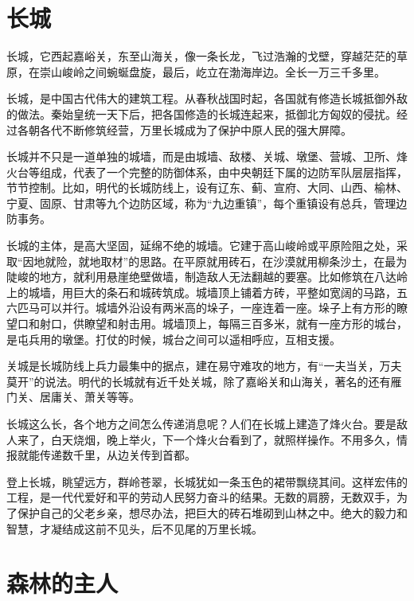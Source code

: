 \documentclass[12pt,UTF-8,openany]{ctexbook}
\begin{document}
\chapter{长城}

\begin{Large}
    
    长城，它西起嘉峪关，东至山海关，像一条长龙，飞过浩瀚的戈壁，穿越茫茫的草原，在崇山峻岭之间蜿蜒盘旋，最后，屹立在渤海岸边。全长一万三千多里。
    
    长城，是中国古代伟大的建筑工程。从春秋战国时起，各国就有修造长城抵御外敌的做法。秦始皇统一天下后，把各国修造的长城连起来，抵御北方匈奴的侵扰。经过各朝各代不断修筑经营，万里长城成为了保护中原人民的强大屏障。
    
    长城并不只是一道单独的城墙，而是由城墙、敌楼、关城、墩堡、营城、卫所、烽火台等组成，代表了一个完整的防御体系，由中央朝廷下属的边防军队层层指挥，节节控制。比如，明代的长城防线上，设有辽东、蓟、宣府、大同、山西、榆林、宁夏、固原、甘肃等九个边防区域，称为“九边重镇”，每个重镇设有总兵，管理边防事务。
    
    长城的主体，是高大坚固，延绵不绝的城墙。它建于高山峻岭或平原险阻之处，采取“因地就险，就地取材”的思路。在平原就用砖石，在沙漠就用柳条沙土，在最为陡峻的地方，就利用悬崖绝壁做墙，制造敌人无法翻越的要塞。比如修筑在八达岭上的城墙，用巨大的条石和城砖筑成。城墙顶上铺着方砖，平整如宽阔的马路，五六匹马可以并行。城墙外沿设有两米高的垛子，一座连着一座。垛子上有方形的瞭望口和射口，供瞭望和射击用。城墙顶上，每隔三百多米，就有一座方形的城台，是屯兵用的墩堡。打仗的时候，城台之间可以遥相呼应，互相支援。
    
    关城是长城防线上兵力最集中的据点，建在易守难攻的地方，有“一夫当关，万夫莫开”的说法。明代的长城就有近千处关城，除了嘉峪关和山海关，著名的还有雁门关、居庸关、萧关等等。
    
    长城这么长，各个地方之间怎么传递消息呢？人们在长城上建造了烽火台。要是敌人来了，白天烧烟，晚上举火，下一个烽火台看到了，就照样操作。不用多久，情报就能传递数千里，从边关传到首都。
    
    登上长城，眺望远方，群岭苍翠，长城犹如一条玉色的裙带飘绕其间。这样宏伟的工程，是一代代爱好和平的劳动人民努力奋斗的结果。无数的肩膀，无数双手，为了保护自己的父老乡亲，想尽办法，把巨大的砖石堆砌到山林之中。绝大的毅力和智慧，才凝结成这前不见头，后不见尾的万里长城。
    
\end{Large}

\chapter{森林的主人}
\end{document}
